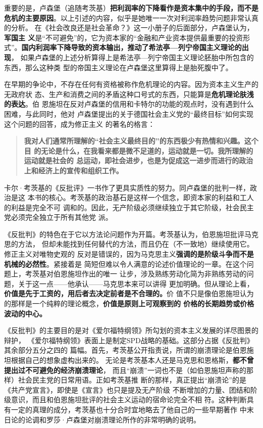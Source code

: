 重要的是，卢森堡（追随考茨基）\textbf{把利润率的下降看作是资本集中的手段，而不是
  危机的主要原因}。以上引述的内容，似乎是她唯一一次对利润率趋势问题非常认真的分析。
在《社会改良还是社会革命？》这一小册子的后面部分，卢森堡认为，\textbf{军国主
  义}是“不可避免”的，它为资本家的“金融和产业资本提供最重要的投资形
式”。\textbf{国内利润率下降导致的资本输出，推动了希法亭—列宁帝国主义理论的出现}，
如果卢森堡的上述分析算得上是希法亭—列宁帝国主义理论胚胎中所包含的东西，那么这种类
型的帝国主义理论在卢森堡这里算得上是胎死腹中了。

在早期的争论中，不存在任何有资格被称作危机理论的内容。因为资本主义生产的无政府状
态、生产和消费之间的矛盾这种口号式的东西，只能算是\textbf{危机理论肤浅的表达}。伯
恩施坦在反对卢森堡的信用和卡特尔的功能的观点时，没有遇到什么困难，与此同时，他对
卢森堡提出的关于德国社会主义党的“最终目标”如何实现这个问题的回答，成为修正主义
的著名的格言：
\begin{quotation}
  \textbf{我对人们通常所理解的“社会主义最终目的”的东西极少有热情和兴趣。这个目
    的无论是什么，在我看来都是微不足道的，运动就是一切。我所理解的运动就是社会的
    总运动，即社会进步，也是为促成这一进步而进行的政治上和经济上的宣传和组织工作。}
\end{quotation}

卡尔·考茨基的《反批评》一书作了更具实质性的努力。同卢森堡的批判一样，政治是这
本书的核心。考茨基的政治基石是这样一个信念，即资本家的利益和工人的利益是完全不可
调和的。因此，无产阶级必须继续独立于其它阶级，社会民主党必须完全独立于所有其他党
派。

《反批判》的特色在于它以方法论问题作为开篇。考茨基认为，伯恩施坦批评马克思的方法，
但却未能找到任何替代的方法，而且仍在（不一致地）继续使用它。修正主义对唯物史观的
反对是错误的，因为马克思主义\textbf{强调的是阶级斗争而不是机械的必然性}。紧接着是
简短但难以令人满意的论述价值理论的一章。在这个问题上，考茨基对伯恩施坦作出的唯一
让步，涉及熟练劳动化简为非熟练劳动的问题，关于这一点——他承认——马克思本来可以讲得
更加明确。但从理论上看，\textbf{价值是先于工资的，用后者去决定前者是不合理的。}价
值不只是像伯恩施坦认为的那样是一个纯粹的理论概念，\textbf{价值是原则上可观察到的
  价格的长期趋势或价格波动的中心。}

《反批判》的主要目的是对《爱尔福特纲领》所勾划的资本主义发展的详尽图景的辩护，
《爱尔福特纲领》表面上是制定SPD战略的基础。这部分占据《反批判》其余部分五分之四的
篇幅。首先，考茨基公开指责说，所谓的崩溃理论是伯恩施坦根据自己的想象虚构出来的。
无论是考茨基本人还是马克思和恩格斯，\textbf{都不曾提出过不可避免的经济崩溃理论}，
而且“崩溃”一词也不是（如伯恩施坦声称的那样）社会民主党的日常用语。正如考茨基推
断的那样，真正提出“崩溃论”的是《共产党宣言》，即使是《宣言》也只是提及无产阶级
不断增加的力量、团结和阶级意识，而且和伯恩施坦批评的社会主义运动的宿命论完全不相
符。这种判断具有一定的真理的成分，考茨基也十分合时宜地略去了他自己的一些早期著作
中末日论的论调和罗莎·卢森堡对崩溃理论所作的非常明确的说明。

